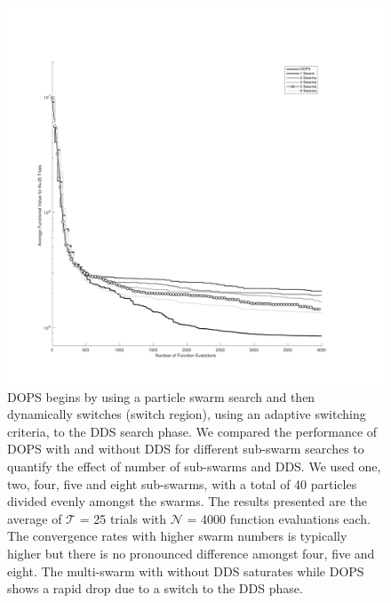 \documentclass{bmcart}
\begin{document}
\begin{backmatter}
\clearpage

\begin{figure}[h!]
\centering
\includegraphics[width = 1.0\textwidth]{./rachelfigs/RecreateFigure7}
\caption{
DOPS begins by using a particle swarm search and then dynamically switches (switch region), using an adaptive switching criteria, to the DDS search phase.
We compared the performance of DOPS with and without DDS for different sub-swarm searches to quantify the effect of number of sub-swarms and DDS.
We used one, two, four, five and eight sub-swarms, with a total of 40 particles divided evenly amongst the swarms.
The results presented are the average of $\mathcal{T}$ = 25 trials with $\mathcal{N}$ = 4000 function evaluations each.
The convergence rates with higher swarm numbers is typically higher but there is no pronounced difference amongst four, five and eight.
The multi-swarm with without DDS saturates while DOPS shows a rapid drop due to a switch to the DDS phase.
}\label{fig-sub-swarms}
\end{figure}

\clearpage


\end{backmatter}
\end{document}
